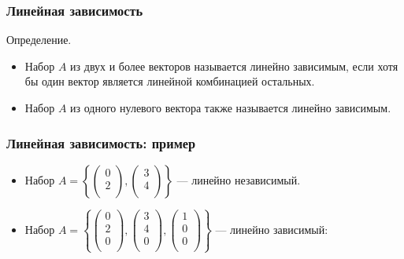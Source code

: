 \begin{frame}
  \frametitle{Линейная зависимость}


  Определение.

  \begin{itemize}[<+->]
    \item Набор $A$ из двух и более векторов называется 
    \alert{линейно зависимым}, если хотя бы один вектор является линейной комбинацией остальных.
    \item Набор $A$ из одного нулевого вектора также называется \alert{линейно зависимым}.
  \end{itemize}
  

\end{frame}


\begin{frame}
  \frametitle{Линейная зависимость: пример}




  \begin{itemize}[<+->]
    \item Набор $A = \left\{ \begin{pmatrix}
      0 \\
      2 \\
    \end{pmatrix}, \begin{pmatrix}
      3 \\
      4 \\
    \end{pmatrix} \right\}$ — линейно независимый.
    \item Набор $A = \left\{ \begin{pmatrix}
      0 \\
      2 \\
      0 \\
    \end{pmatrix}, \begin{pmatrix}
      3 \\
      4 \\
      0 \\
    \end{pmatrix},
    \begin{pmatrix}
      1 \\
      0 \\
      0 \\
    \end{pmatrix} \right\}$ — линейно зависимый:


\end{itemize}
\end{frame}
